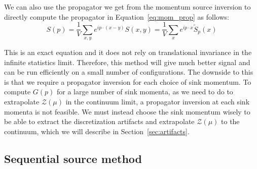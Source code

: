 \documentclass[11pt, oneside]{article}   	%
\theoremstyle{definition}
\begin{document}
We can also use the propagator we get from the momentum source inversion to directly compute the propagator 
in Equation~\ref{eq:mom_prop} as follows:
\begin{equation}
	S(p) = \frac{1}{V}\sum_{x, y} e^{ip\cdot (x - y)} S(x, y) = \frac{1}{V}\sum_x e^{ip\cdot x} \tilde S_p(x) 
\end{equation}

This is an exact equation and it does not rely on translational invariance in the infinite statistics limit. 
Therefore, this method will give much better signal and can be run efficiently on a small number of configurations. The 
downside to this is that we require a propagator inversion for each choice of sink momentum. 
To compute $G(p)$ for a large number of sink momenta, as we need to do to extrapolate $\mathcal Z(\mu)$ in the 
continuum limit, a propagator inversion at each sink momenta is not feasible. We must instead choose the sink momentum 
wisely to be able to extract the discretization artifacts and extrapolate $\mathcal Z(\mu)$ to the continuum, which we will 
describe in Section~\ref{sec:artifacts}. 

\subsection{Sequential source method}
\end{document}
